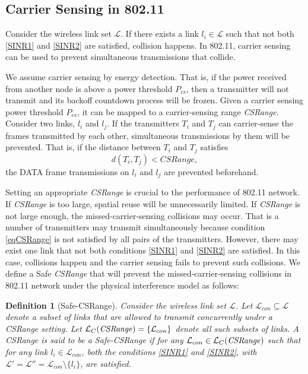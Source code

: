 \documentclass[conference]{IEEEtran}
\newtheorem{definition}{Definition}
\begin{document}
\subsection{Carrier Sensing in 802.11}

Consider the wireless link set $\mathcal{L}$. If there exists a link
$l_i\in\mathcal{L}$ such that not both \eqref{SINR1} and
\eqref{SINR2} are satisf\/ied, collision happens. In 802.11, carrier
sensing can be used to prevent simultaneous transmissions that
collide.

We assume carrier sensing by energy detection. That is, if the power
received from another node is above a power threshold $P_{cs}$, then
a transmitter will not transmit and its backoff countdown process
will be frozen. Given a carrier sensing power threshold $P_{cs}$, it
can be mapped to a carrier-sensing range \emph{CSRange}. Consider
two links, $l_i$ and $l_j$. If the transmitters $T_i$ and $T_j$ can
carrier-sense the frames transmitted by each other, simultaneous
transmissions by them will be prevented. That is, if the distance
between $T_i$ and $T_j$ satisf\/ies
\begin{equation}
d(T_i,T_j)<CSRange, \label{eqCSRange}
\end{equation}
the DATA frame transmissions on $l_i$ and $l_j$ are prevented
beforehand.

Setting an appropriate \emph{CSRange} is crucial to the performance
of 802.11 network. If \emph{CSRange} is too large, spatial reuse
will be unnecessarily limited. If \emph{CSRange} is not large
enough, the missed-carrier-sensing collisions may occur. That is a
number of transmitters may transmit simultaneously because condition
\eqref{eqCSRange} is not satisfied by all pairs of the transmitters.
However, there may exist one link that not both conditions
\eqref{SINR1} and \eqref{SINR2} are satisf\/ied. In this case,
collisions happen and the carrier sensing fails to prevent such
collisions. We def\/ine a Safe \emph{CSRange} that will prevent the
missed-carrier-sensing collisions in 802.11 network under the
physical interference model as follows:
\begin{definition}[Safe-CSRange]
Consider the wireless link set $\mathcal{L}$. Let
$\mathcal{L}_{con}\subseteq \mathcal{L}$ denote a subset of links
that are allowed to transmit concurrently under a \emph{CSRange}
setting. Let $\mathcal{L}_{C}(\text{\emph{CSRange}})
=\{\mathcal{L}_{con}\}$ denote all such subsets of links. A
\emph{CSRange} is said to be a \emph{Safe-CSRange} if for any
$\mathcal{L}_{con}\in \mathcal{L}_{C}(\text{\emph{CSRange}})$ such
that for any link $l_i\in\mathcal{L}_{con}$, both the conditions
\eqref{SINR1} and \eqref{SINR2}, with
$\mathcal{L}'=\mathcal{L}''=\mathcal{L}_{con}\setminus \{l_i\}$, are
satisf\/ied.
\end{definition}
\end{document}
